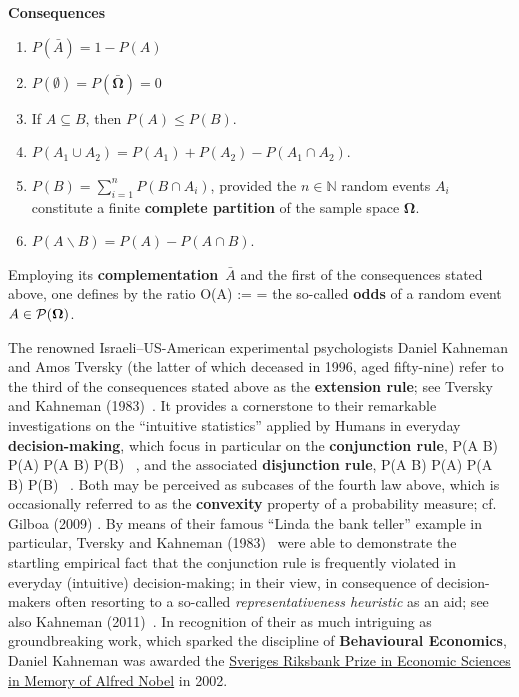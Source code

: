 \medskip
\noindent
\textbf{Consequences}
%
\begin{enumerate}

\item $P(\bar{A}) = 1-P(A)$

\item $P(\emptyset) = P(\bar{\boldsymbol{\Omega}}) = 0$

\item If $A \subseteq B$, then $P(A) \leq P(B)$.

\item $P(A_{1} \cup A_{2}) = P(A_{1})+P(A_{2})-P(A_{1} \cap 
A_{2})$.

\item $\displaystyle P(B) = \sum_{i=1}^{n}P(B \cap A_{i})$,
provided the $n \in \mathbb{N}$ random events $A_{i}$ constitute a 
finite \textbf{complete partition} of the sample space 
$\boldsymbol{\Omega}$.

\item $P(A\backslash B) = P(A) - P(A \cap B)$.

\end{enumerate}
%

\vspace{5mm}
\noindent
Employing its \textbf{complementation}~$\bar{A}$ and the first of
the consequences stated above, one defines by the ratio
%
\be
{}
O(A) :=  = 
\ee
%
the so-called \textbf{odds} of a random event
$A \in {\cal P}(\boldsymbol{\Omega})$.

\medskip
\noindent
The renowned Israeli--US-American experimental psychologists 
Daniel Kahneman and Amos Tversky (the latter of which deceased in 
1996, aged fifty-nine) refer to the third of the consequences
stated above as the \textbf{extension rule}; see Tversky and
Kahneman (1983)~. It provides a cornerstone
to their remarkable investigations on the ``intuitive statistics''
applied by Humans in everyday \textbf{decision-making}, which focus
in particular on the \textbf{conjunction rule},
%
\be
{}
P(A \cap B) \leq P(A)
\quad{}\quad
P(A \cap B) \leq P(B) \ ,
\ee
%
and the associated \textbf{disjunction rule},
%
\be
{}
P(A \cup B) \geq P(A)
\quad{}\quad
P(A \cup B) \geq P(B) \ .
\ee
%
Both may be perceived as subcases of the fourth law above, which 
is occasionally referred to as the \textbf{convexity} property of a 
probability measure; cf. Gilboa (2009) . By 
means of their famous ``Linda the bank teller'' example in 
particular, Tversky and Kahneman (1983)~ 
were able to demonstrate the startling empirical fact that the 
conjunction rule is frequently violated in everyday (intuitive)
decision-making; in their view, in consequence of decision-makers 
often resorting to a so-called \textit{representativeness
heuristic} as an aid; see also Kahneman
(2011)~. In recognition of their as much
intriguing as groundbreaking work, which sparked the discipline of
\textbf{Behavioural Economics}, Daniel Kahneman was awarded the  
\href{http://www.nobelprize.org/nobel_prizes/economics/laureates/2002/}{Sveriges
Riksbank Prize in Economic Sciences in Memory of Alfred Nobel}
in 2002.


